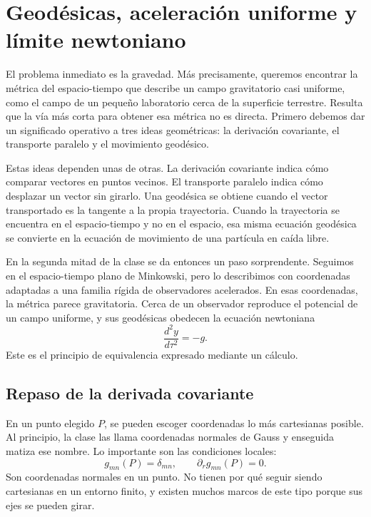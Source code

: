 \chapter{Geodésicas, aceleración uniforme y límite newtoniano}

El problema inmediato es la gravedad. Más precisamente, queremos encontrar la métrica del espacio-tiempo que describe un campo gravitatorio casi uniforme, como el campo de un pequeño laboratorio cerca de la superficie terrestre. Resulta que la vía más corta para obtener esa métrica no es directa. Primero debemos dar un significado operativo a tres ideas geométricas: la derivación covariante, el transporte paralelo y el movimiento geodésico.

Estas ideas dependen unas de otras. La derivación covariante indica cómo comparar vectores en puntos vecinos. El transporte paralelo indica cómo desplazar un vector sin girarlo. Una geodésica se obtiene cuando el vector transportado es la tangente a la propia trayectoria. Cuando la trayectoria se encuentra en el espacio-tiempo y no en el espacio, esa misma ecuación geodésica se convierte en la ecuación de movimiento de una partícula en caída libre.

En la segunda mitad de la clase se da entonces un paso sorprendente. Seguimos en el espacio-tiempo plano de Minkowski, pero lo describimos con coordenadas adaptadas a una familia rígida de observadores acelerados. En esas coordenadas, la métrica parece gravitatoria. Cerca de un observador reproduce el potencial de un campo uniforme, y sus geodésicas obedecen la ecuación newtoniana
\begin{equation}
\frac{d^2y}{d\tau^2}=-g.
\end{equation}
Este es el principio de equivalencia expresado mediante un cálculo.

\section{Repaso de la derivada covariante}

En un punto elegido \(P\), se pueden escoger coordenadas lo más cartesianas posible. Al principio, la clase las llama coordenadas normales de Gauss y enseguida matiza ese nombre. Lo importante son las condiciones locales:
\begin{equation}
g_{mn}(P)=\delta_{mn},
\qquad
\partial_r g_{mn}(P)=0.
\label{eq:l4-normal-point}
\end{equation}
Son coordenadas normales en un punto. No tienen por qué seguir siendo cartesianas en un entorno finito, y existen muchos marcos de este tipo porque sus ejes se pueden girar.

